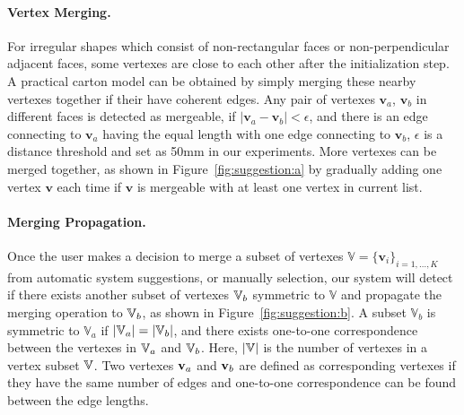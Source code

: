 \paragraph{Vertex Merging.} 
For irregular shapes which consist of non-rectangular faces or non-perpendicular adjacent faces, some vertexes are close to each other after the initialization step.
A practical carton model can be obtained by simply merging these nearby vertexes together if their have coherent edges.
%
Any pair of vertexes $\mathbf{v}_a$, $\mathbf{v}_b$ in different faces is detected as mergeable, if $|\mathbf{v}_a-\mathbf{v}_b|<\epsilon$, and there is an edge connecting to $\mathbf{v}_a$ having the equal length with one edge connecting to $\mathbf{v}_b$,
%
$\epsilon$ is a distance threshold and set as 50mm in our experiments.
More vertexes can be merged together, as shown in Figure~\ref{fig:suggestion:a} by gradually adding one vertex $\mathbf{v}$ each time if $\mathbf{v}$ is mergeable with at least one vertex in current list. 

\paragraph{Merging Propagation.} %
Once the user makes a decision to merge a subset of vertexes $\mathbb{V}=\{\mathbf{v}_i\}_{i=1,\ldots,K}$ from automatic system suggestions, or manually selection, our system will detect if there exists another subset of vertexes $\mathbb{V}_b$ symmetric to $\mathbb{V}$ and propagate the merging operation to $\mathbb{V}_b$, as shown in Figure~\ref{fig:suggestion:b}. 
A subset $\mathbb{V}_b$ is symmetric to $\mathbb{V}_a$ if $|\mathbb{V}_a|=|\mathbb{V}_b|$, and there exists one-to-one correspondence between the vertexes in $\mathbb{V}_a$ and $\mathbb{V}_b$. 
Here, $|\mathbb{V}|$ is the number of vertexes in a vertex subset $\mathbb{V}$. 
Two vertexes $\mathbf{v}_a$ and $\mathbf{v}_b$ are defined as corresponding vertexes if they have the same number of edges and one-to-one correspondence can be found between the edge lengths. 

